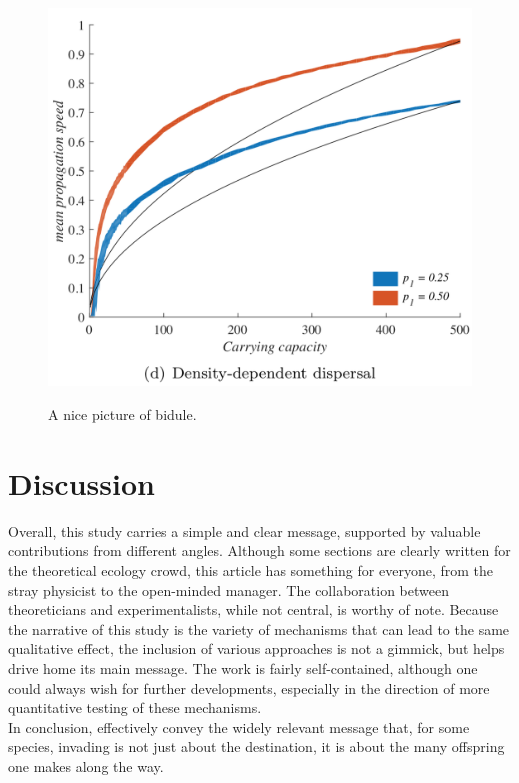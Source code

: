 \documentclass[a4paper]{article}
\begin{document}
\begin{figure}[h]
  \captionsetup{justification=centering}
  \caption{A nice picture of bidule.}
  \centering
  \includegraphics[scale=0.5]{fig.png}
  \label{Fig1}
\end{figure}

\section*{Discussion}
Overall, this study carries a simple and clear message, supported by valuable contributions from different angles. Although some sections are clearly written for the theoretical ecology crowd, this article has something for everyone, from the stray physicist to the open-minded manager. The collaboration between theoreticians and experimentalists, while not central, is worthy of note. Because the narrative of this study is the variety of mechanisms that can lead to the same qualitative effect, the inclusion of various approaches is not a gimmick, but helps drive home its main message. The work is fairly self-contained, although one could always wish for further developments, especially in the direction of more quantitative testing of these mechanisms. \\ 

In conclusion, \textcite{levins1971regional} effectively convey the widely relevant message that, for some species, invading is not just about the destination, it is about the many offspring one makes along the way. \\ 
\end{document}
